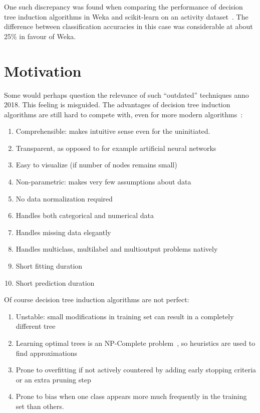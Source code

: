 One such discrepancy was found when comparing the performance of decision tree induction algorithms in Weka and scikit-learn on an activity dataset~\cite{problematic_dataset}. The difference between classification accuracies in this case was considerable at about 25\% in favour of Weka.

\section{Motivation}
Some would perhaps question the relevance of such ``outdated'' techniques anno 2018. This feeling is misguided. The advantages of decision tree induction algorithms are still hard to compete with, even for more modern algorithms~\cite{scikit-learn, murthy1998automatic, kotsiantis2007supervised}:

\begin{enumerate}
    \item Comprehensible: makes intuitive sense even for the uninitiated.
    \item Transparent, as opposed to for example artificial neural networks
    \item Easy to visualize (if number of nodes remains small)
    \item Non-parametric: makes very few assumptions about data
    \item No data normalization required
    \item Handles both categorical and numerical data
    \item Handles missing data elegantly
    \item Handles multiclass, multilabel and multioutput problems natively
    \item Short fitting duration
    \item Short prediction duration
\end{enumerate}

Of course decision tree induction algorithms are not perfect:
\begin{enumerate}
    \item Unstable: small modifications in training set can result in a completely different tree
    \item Learning optimal trees is an NP-Complete problem~\cite{npcomplete}, so heuristics are used to find approximations
    \item Prone to overfitting if not actively countered by adding early stopping criteria or an extra pruning step
    \item Prone to bias when one class appears more much frequently in the training set than others.
\end{enumerate}

